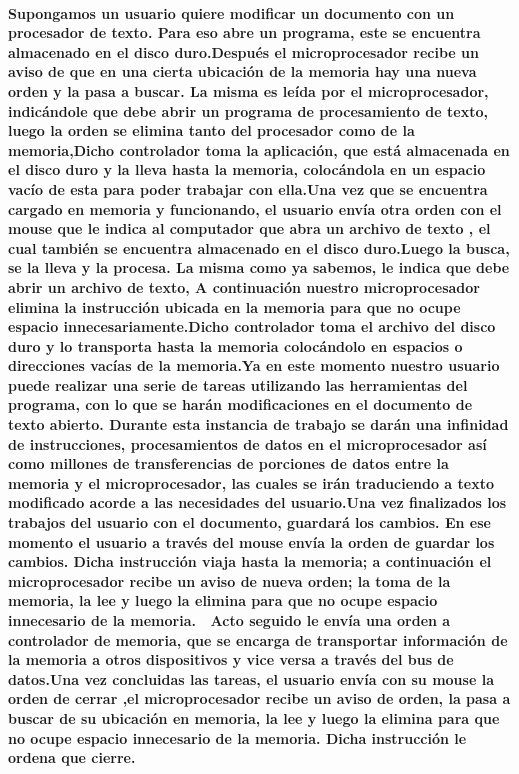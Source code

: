 \documentclass{article}
\begin{document}
\paragraph{Supongamos un usuario quiere modificar un documento con un procesador de texto. Para eso abre
un programa, este se encuentra almacenado en el disco duro.Después el microprocesador recibe un aviso de que en una cierta ubicación de la memoria hay una nueva orden y la pasa a buscar. La misma es leída por el microprocesador, indicándole que debe abrir un programa de procesamiento de texto, luego la orden se elimina tanto del procesador como de la memoria,Dicho controlador toma la aplicación, que está almacenada en el disco duro y la lleva hasta la memoria, colocándola en un espacio
vacío de esta para poder trabajar con ella.Una vez que se encuentra cargado en memoria y
funcionando, el usuario envía otra orden con el mouse que le indica al computador que abra
un archivo de texto , el cual también se encuentra almacenado en el disco duro.Luego la busca, se la lleva y la procesa. La misma como ya sabemos, le indica que debe abrir un archivo de texto, A continuación nuestro microprocesador elimina la instrucción ubicada en la memoria para
que no ocupe espacio innecesariamente.Dicho controlador toma el archivo del disco duro y lo transporta hasta la memoria colocándolo en espacios o direcciones vacías de la memoria.Ya en este momento nuestro usuario puede realizar una serie de tareas utilizando las
herramientas del programa, con lo que se harán modificaciones en el documento de
texto abierto. Durante esta instancia de trabajo se darán una infinidad de instrucciones,
procesamientos de datos en el microprocesador así como millones de transferencias de
porciones de datos entre la memoria y el microprocesador, las cuales se irán traduciendo a
texto modificado acorde a las necesidades del usuario.Una vez finalizados los trabajos del usuario con el documento, guardará los cambios. En ese
momento el usuario a través del mouse envía la orden de guardar los cambios. Dicha
instrucción viaja hasta la memoria; a continuación el microprocesador recibe un aviso de
nueva orden; la toma de la memoria, la lee y luego la elimina para que no ocupe espacio
innecesario de la memoria.
 Acto seguido le envía una orden a controlador de memoria, que se encarga de transportar
información de la memoria a otros dispositivos y vice versa a través del bus de datos.Una vez concluidas las tareas, el usuario envía con su mouse la orden de cerrar ,el microprocesador recibe un aviso de orden, la pasa a buscar de su ubicación en memoria,
la lee y luego la elimina para que no ocupe espacio innecesario de la memoria. Dicha
instrucción le ordena que cierre.\cite{taller}}
\end{document}
